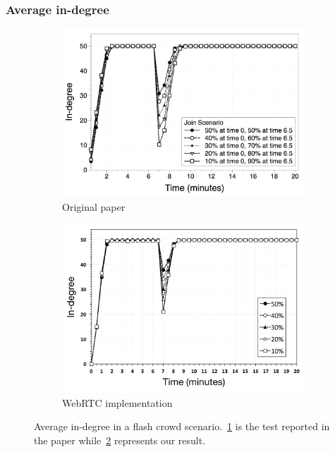 \documentclass{beamer}
\begin{document}
\begin{frame}
\frametitle{Average in-degree}

\begin{figure}
\centering
\begin{subfigure}{.5\textwidth}
  \centering
  \includegraphics[keepaspectratio=true, width=1\linewidth]{images/paper_average_indegree}
  \caption{Original paper}
  \label{fig:paper_average_indegree}
\end{subfigure}%
\begin{subfigure}{.5\textwidth}
  \centering
  \includegraphics[keepaspectratio=true, width=1\linewidth]{images/average_indegree}
  \caption{WebRTC implementation}
  \label{fig:average_indegree}
\end{subfigure}
\caption{Average in-degree in a flash crowd scenario.~\ref{fig:paper_average_indegree} is the test reported in the paper while~\ref{fig:average_indegree} represents our result.}
\label{fig:robustness_indegree_flash_crowd}
\end{figure}

\end{frame}
\end{document}
